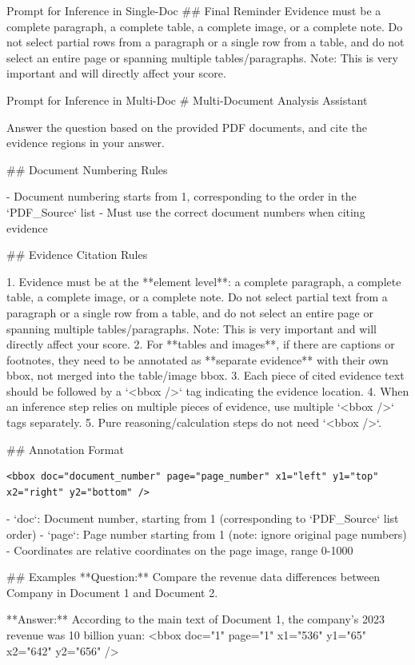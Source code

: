 \documentclass{llmxive}
\begin{document}
{{{\begin{promptbox}[breakable]{Prompt for Inference in Single-Doc}
## Final Reminder
Evidence must be a complete paragraph, a complete table, a complete image, or a complete note. Do not select partial rows from a paragraph or a single row from a table, and do not select an entire page or spanning multiple tables/paragraphs. Note: This is very important and will directly affect your score.
\end{promptbox}

\begin{promptbox}[breakable]{Prompt for Inference in Multi-Doc}
# Multi-Document Analysis Assistant

Answer the question based on the provided PDF documents, and cite the evidence regions in your answer.

## Document Numbering Rules

- Document numbering starts from 1, corresponding to the order in the `PDF_Source` list
- Must use the correct document numbers when citing evidence

## Evidence Citation Rules

1. Evidence must be at the **element level**: a complete paragraph, a complete table, a complete image, or a complete note. Do not select partial text from a paragraph or a single row from a table, and do not select an entire page or spanning multiple tables/paragraphs. Note: This is very important and will directly affect your score.
2. For **tables and images**, if there are captions or footnotes, they need to be annotated as **separate evidence** with their own bbox, not merged into the table/image bbox.
3. Each piece of cited evidence text should be followed by a `<bbox />` tag indicating the evidence location.
4. When an inference step relies on multiple pieces of evidence, use multiple `<bbox />` tags separately.
5. Pure reasoning/calculation steps do not need `<bbox />`.

## Annotation Format
\begin{lstlisting}
<bbox doc="document_number" page="page_number" x1="left" y1="top" x2="right" y2="bottom" />
\end{lstlisting}
- `doc`: Document number, starting from 1 (corresponding to `PDF_Source` list order)
- `page`: Page number starting from 1 (note: ignore original page numbers)
- Coordinates are relative coordinates on the page image, range 0-1000

## Examples
**Question:** Compare the revenue data differences between Company in Document 1 and Document 2.

**Answer:**
According to the main text of Document 1, the company's 2023 revenue was 10 billion yuan:
<bbox doc="1" page="1" x1="536" y1="65" x2="642" y2="656" />


\end{promptbox}}}}
\end{document}
